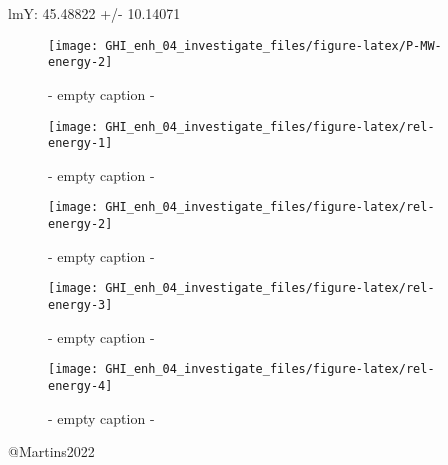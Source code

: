 \documentclass[
  10pt,
  a4paper,oneside]{article}
\begin{document}
lmY: 45.48822 +/- 10.14071

\begin{figure}[H]

{\centering \texttt{[image: GHI\_enh\_04\_investigate\_files/figure-latex/P-MW-energy-2]} 

}

\caption{ - empty caption - }\label{fig:P-MW-energy-2}
\end{figure}
\begin{figure}[H]

{\centering \texttt{[image: GHI\_enh\_04\_investigate\_files/figure-latex/rel-energy-1]} 

}

\caption{ - empty caption - }\label{fig:rel-energy-1}
\end{figure}
\begin{figure}[H]

{\centering \texttt{[image: GHI\_enh\_04\_investigate\_files/figure-latex/rel-energy-2]} 

}

\caption{ - empty caption - }\label{fig:rel-energy-2}
\end{figure}
\begin{figure}[H]

{\centering \texttt{[image: GHI\_enh\_04\_investigate\_files/figure-latex/rel-energy-3]} 

}

\caption{ - empty caption - }\label{fig:rel-energy-3}
\end{figure}
\begin{figure}[H]

{\centering \texttt{[image: GHI\_enh\_04\_investigate\_files/figure-latex/rel-energy-4]} 

}

\caption{ - empty caption - }\label{fig:rel-energy-4}
\end{figure}

@Martins2022
\end{document}
